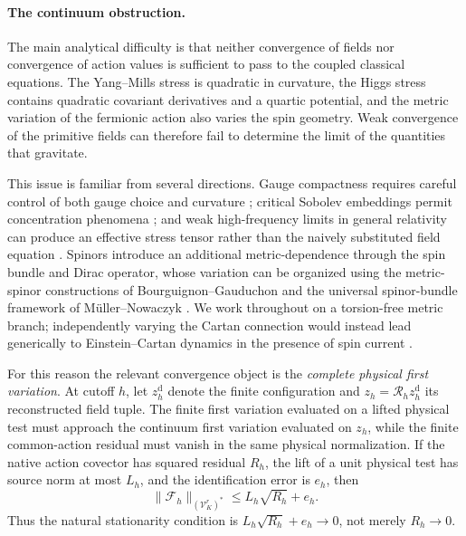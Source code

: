 \documentclass[11pt]{article}
\numberwithin{equation}{section}
\theoremstyle{definition}
\theoremstyle{remark}
\newcommand{\norm}[1]{\lVert#1\rVert}
\newcommand{\Vtest}{\mathscr V}
\begin{document}
\paragraph{The continuum obstruction.}

The main analytical difficulty is that neither convergence of fields nor
convergence of action values is sufficient to pass to the coupled classical
equations.  The Yang--Mills stress is quadratic in curvature, the Higgs stress
contains quadratic covariant derivatives and a quartic potential, and the
metric variation of the fermionic action also varies the spin geometry.
Weak convergence of the primitive fields can therefore fail to determine the
limit of the quantities that gravitate.

This issue is familiar from several directions.  Gauge compactness requires
careful control of both gauge choice and curvature \cite{Uhlenbeck1982};
critical Sobolev embeddings permit concentration phenomena
\cite{Lions1985}; and weak high-frequency limits in general relativity can
produce an effective stress tensor rather than the naively substituted field
equation \cite{Burnett1989,HuneauLuk2024}.  Spinors introduce an additional
metric-dependence through the spin bundle and Dirac operator, whose variation
can be organized using the metric-spinor constructions of
Bourguignon--Gauduchon \cite{BourguignonGauduchon1992} and the universal
spinor-bundle framework of M\"uller--Nowaczyk
\cite{MullerNowaczyk2017}.  We work throughout on a torsion-free metric
branch; independently varying the Cartan connection would instead lead
generically to Einstein--Cartan dynamics in the presence of spin current
\cite{Kibble1961,HehlEtAl1976}.

For this reason the relevant convergence object is the
\emph{complete physical first variation}.  At cutoff $h$, let
$z_h^{\mathrm d}$ denote the finite configuration and
$z_h=\mathcal R_hz_h^{\mathrm d}$ its reconstructed field tuple.  The finite
first variation evaluated on a lifted physical test must approach the
continuum first variation evaluated on $z_h$, while the finite common-action
residual must vanish in the same physical normalization.  If the native
action covector has squared residual $R_h$, the lift of a unit physical test
has source norm at most $L_h$, and the identification error is $e_h$, then
\begin{equation}
\norm{\mathcal F_h}_{(\Vtest_K^r)^*}
\le
L_h\sqrt{R_h}+e_h.
\label{eq:intro-scaled-stationarity}
\end{equation}
Thus the natural stationarity condition is
$L_h\sqrt{R_h}+e_h\to0$, not merely $R_h\to0$.
\end{document}
